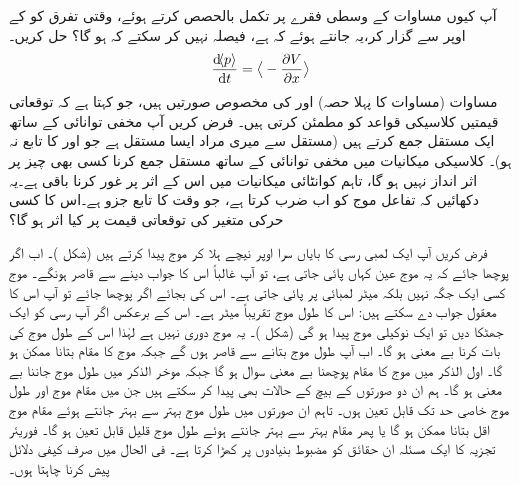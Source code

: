 آپ کیوں مساوات  کے وسطی فقرے پر تکمل بالحصص کرتے ہوئے، وقتی تفرق کو  کے اوپر سے گزار کر،یہ جانتے ہوئے کہ  ہے، فیصلہ نہیں کر سکتے کہ  ہو گا؟
 حل کریں۔
\begin{align}\label{مساوات_تفاعل_موج_مخفی_توانائی_سے_معیار_حرکت}
\frac{\dif\langle p \rangle}{\dif t}=\big\langle-\frac{\partial V}{\partial x} \big\rangle
\end{align}
مساوات  (مساوات  کا پہلا حصہ) اور  
 کی مخصوص صورتیں ہیں، جو کہتا ہے کہ توقعاتی قیمتیں کلاسیکی قواعد کو مطمئن کرتی ہیں۔
فرض کریں آپ مخفی توانائی کے ساتھ ایک مستقل جمع کرتے ہیں (مستقل سے میری مراد ایسا مستقل ہے جو  اور  کا تابع نہ ہو)۔ کلاسیکی میکانیات میں مخفی توانائی کے ساتھ مستقل جمع کرنا کسی بھی چیز پر اثر انداز نہیں ہو گا، تاہم کوانٹائی میکانیات میں اس کے اثر پر غور کرنا باقی ہے۔یہ دکھائیں کہ تفاعل موج کو اب  ضرب کرتا ہے، جو وقت کا تابع جزو ہے۔اس کا کسی حرکی متغیر کی توقعاتی قیمت پر کیا اثر ہو گا؟ 

فرض کریں آپ ایک لمبی رسی کا بایاں سرا اوپر نیچے ہلا کر موج پیدا کرتے ہیں (شکل )۔ اب اگر پوچھا جائے کہ یہ موج عین کہاں پائی جاتی ہے، تو آپ غالباً اس کا جواب دینے سے قاصر ہونگے۔ موج کسی ایک جگہ نہیں بلکہ  میٹر لمبائی پر پائی جاتی ہے۔ اس کی بجائے اگر  پوچھا جائے تو آپ اس کا معقول جواب دے سکتے ہیں: اس کا طول موج تقریباً  میٹر ہے۔ اس کے برعکس اگر آپ رسی کو ایک جھٹکا دیں تو ایک نوکیلی موج پیدا ہو گی
 (شکل )۔ یہ موج دوری نہیں ہے لہٰذا اس کے طول موج کی بات کرنا بے معنی ہو گا۔ اب آپ طول موج بتانے سے قاصر ہوں گے جبکہ موج کا مقام بتانا ممکن ہو گا۔ اول الذکر میں موج کا مقام پوچھنا بے معنی سوال ہو گا جبکہ موخر الذکر میں طول موج جاننا بے معنی ہو گا۔ ہم ان دو صورتوں کے بیچ کے حالات بھی پیدا کر سکتے ہیں جن میں مقام موج اور طول موج خاصی حد تک قابل تعین ہوں۔ تاہم ان صورتوں میں طول موج بہتر سے بہتر جانتے ہوئے مقام موج اقل بتانا ممکن ہو گا یا پھر مقام بہتر سے بہتر جانتے ہوئے طول موج قلیل  قابل تعین ہو گا۔ فوریئر تجزیہ کا ایک مسئلہ ان حقائق کو مضبوط بنیادوں پر کھڑا کرتا ہے۔ فی الحال میں صرف کیفی دلائل پیش کرنا چاہتا ہوں۔

